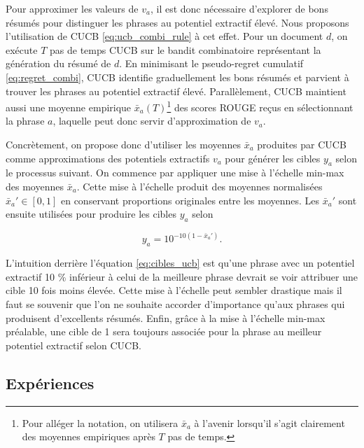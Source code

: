 Pour approximer les valeurs de $v_a$, il est donc nécessaire 
d'explorer de bons résumés pour distinguer les phrases 
au potentiel extractif élevé.
Nous proposons l'utilisation de CUCB \eqref{eq:ucb_combi_rule} à cet effet. 
Pour un document $d$, on exécute $T$ pas de temps CUCB 
sur le bandit combinatoire représentant la génération du résumé de $d$.
En minimisant le pseudo-regret cumulatif \eqref{eq:regret_combi}, CUCB identifie graduellement les 
bons résumés et parvient à trouver les phrases 
au potentiel extractif élevé.
Parallèlement, CUCB maintient aussi une 
moyenne empirique $\bar{x}_a(T)$\footnote{Pour alléger la notation,
on utilisera $\bar{x}_a$ à l'avenir lorsqu'il s'agit clairement 
des moyennes empiriques après $T$ pas de temps.} des scores ROUGE reçus 
en sélectionnant la phrase $a$, laquelle peut donc 
servir d'approximation de $v_a$.

Concrètement, on propose donc d'utiliser les moyennes $\bar{x}_a$ produites 
par CUCB comme approximations des potentiels extractifs $v_a$ pour générer les cibles $y_a$ selon le processus suivant.
On commence par appliquer une mise à l'échelle min-max des moyennes $\bar{x}_a$.
Cette mise à l'échelle produit des moyennes normalisées $\bar{x}_a' \in [0, 1]$
en conservant proportions originales entre les moyennes.
Les $\bar{x}_a'$ sont ensuite utilisées pour produire les cibles $y_a$ selon

\begin{equation}
    y_a = 10^{-10(1 - \bar{x}_a')}.
    \label{eq:cibles_ucb}
\end{equation}

L'intuition derrière l'équation \eqref{eq:cibles_ucb} est qu'une phrase 
avec un potentiel extractif 10 \% inférieur à celui de la meilleure phrase 
devrait se voir attribuer une cible 10 fois moins élevée. 
Cette mise à l'échelle peut sembler drastique mais il faut se souvenir 
que l'on ne souhaite accorder d'importance qu'aux phrases qui produisent 
d'excellents résumés.
Enfin, grâce à la mise à l'échelle min-max préalable, une cible de 1 
sera toujours associée pour la phrase au meilleur potentiel 
extractif selon CUCB.

\subsection{Expériences}
\label{subsec:exp_cucb}


